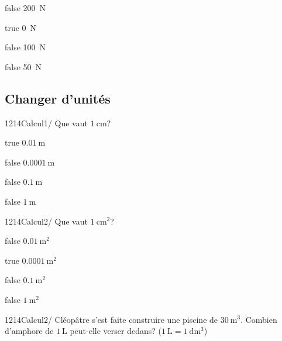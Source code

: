 \documentclass[11pt]{article}
\begin{document}
            \begin{reponses}
                \item[false] \SI{200}{\newton}
                \item[true] \SI{0}{\newton}
                \item[false] \SI{100}{\newton}
                \item[false] \SI{50}{\newton}
            \end{reponses}
            
        \subsection{Changer d'unités}
        
        	\begin{question}{1214}{Calcul}{1}{/}
				Que vaut $\SI{1}{\centi\meter}$?
            \end{question}

            \begin{reponses}
            	\item[true] $\SI{0,01}{\meter}$
            	\item[false] $\SI{0,0001}{\meter}$
                \item[false] $\SI{0,1}{\meter}$
                \item[false] $\SI{1}{\meter}$
            \end{reponses}
        
        	\begin{question}{1214}{Calcul}{2}{/}
				Que vaut $\SI{1}{\centi\meter^2}$?
            \end{question}

            \begin{reponses}
            	\item[false] $\SI{0,01}{\meter^2}$
            	\item[true] $\SI{0,0001}{\meter^2}$
                \item[false] $\SI{0,1}{\meter^2}$
                \item[false] $\SI{1}{\meter^2}$
            \end{reponses}
        
        	\begin{question}{1214}{Calcul}{2}{/}
				Cléopâtre s'est faite construire une piscine de $\SI{30}{\meter^3}$. Combien d'amphore de $\SI{1}{\liter}$ peut-elle verser dedans? ($\SI{1}{\liter}=\SI{1}{\deci\meter^3}$)
            \end{question}
\end{document}
